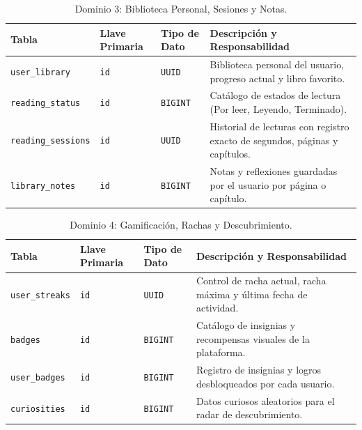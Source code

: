 \documentclass[12pt, atypical, journal]{article}
\begin{document}
\begin{table}[H]
\centering
\footnotesize
\begin{tabular}{|p{3.5cm}|p{2.3cm}|p{2cm}|p{5.5cm}|}
\hline
\textbf{Tabla} & \textbf{Llave Primaria} & \textbf{Tipo de Dato} & \textbf{Descripción y Responsabilidad} \\ \hline
\texttt{user\_library} & \texttt{id} & \texttt{UUID} & Biblioteca personal del usuario, progreso actual y libro favorito. \\ \hline
\texttt{reading\_status} & \texttt{id} & \texttt{BIGINT} & Catálogo de estados de lectura (Por leer, Leyendo, Terminado). \\ \hline
\texttt{reading\_sessions}& \texttt{id} & \texttt{UUID} & Historial de lecturas con registro exacto de segundos, páginas y capítulos. \\ \hline
\texttt{library\_notes} & \texttt{id} & \texttt{BIGINT} & Notas y reflexiones guardadas por el usuario por página o capítulo. \\ \hline
\end{tabular}
\caption{Dominio 3: Biblioteca Personal, Sesiones y Notas.}
\label{tab:db_library}
\end{table}

\begin{table}[H]
\centering
\footnotesize
\begin{tabular}{|p{3.5cm}|p{2.3cm}|p{2cm}|p{5.5cm}|}
\hline
\textbf{Tabla} & \textbf{Llave Primaria} & \textbf{Tipo de Dato} & \textbf{Descripción y Responsabilidad} \\ \hline
\texttt{user\_streaks} & \texttt{id} & \texttt{UUID} & Control de racha actual, racha máxima y última fecha de actividad. \\ \hline
\texttt{badges} & \texttt{id} & \texttt{BIGINT} & Catálogo de insignias y recompensas visuales de la plataforma. \\ \hline
\texttt{user\_badges} & \texttt{id} & \texttt{BIGINT} & Registro de insignias y logros desbloqueados por cada usuario. \\ \hline
\texttt{curiosities} & \texttt{id} & \texttt{BIGINT} & Datos curiosos aleatorios para el radar de descubrimiento. \\ \hline
\end{tabular}
\caption{Dominio 4: Gamificación, Rachas y Descubrimiento.}
\label{tab:db_gamification}
\end{table}
\end{document}
